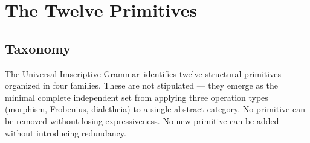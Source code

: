 \documentclass[12pt,a4paper]{article}
\newcommand{\UIG}{Universal Imscriptive Grammar}
\begin{document}
\section{The Twelve Primitives}
\label{sec:primitives}

\subsection{Taxonomy}

The \UIG\ identifies twelve structural primitives organized in four families. These are not stipulated --- they emerge as the minimal complete independent set from applying three operation types (morphism, Frobenius, dialetheia) to a single abstract category. No primitive can be removed without losing expressiveness. No new primitive can be added without introducing redundancy.
\end{document}
